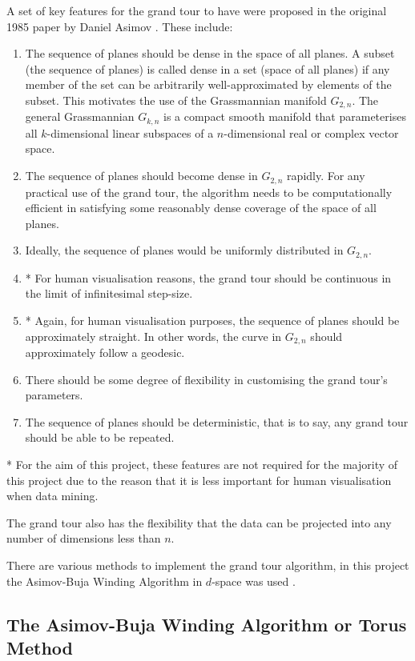 \documentclass[a4paper,11pt,twoside]{article}
\begin{document}
A set of key features for the grand tour to have were proposed in the original 1985 paper by Daniel Asimov \cite{Asimov1985}. These include:
\begin{enumerate}
\item The sequence of planes should be dense in the space of all planes. A subset (the sequence of planes) is called dense in a set (space of all planes) if any member of the set can be arbitrarily well-approximated by elements of the subset. This motivates the use of the Grassmannian manifold $G_{2,n}$. The general Grassmannian $G_{k,n}$ is a compact smooth manifold that parameterises all $k$-dimensional linear subspaces of a $n$-dimensional real or complex vector space.
\item The sequence of planes should become dense in $G_{2,n}$ rapidly. For any practical use of the grand tour, the algorithm needs to be computationally efficient in satisfying some reasonably dense coverage of the space of all planes.
\item Ideally, the sequence of planes would be uniformly distributed in $G_{2,n}$.
\item* For human visualisation reasons, the grand tour should be continuous in the limit of infinitesimal step-size.
\item* Again, for human visualisation purposes, the sequence of planes should be approximately straight. In other words, the curve in $G_{2,n}$ should approximately follow a geodesic.
\item There should be some degree of flexibility in customising the grand tour's parameters.
\item The sequence of planes should be deterministic, that is to say, any grand tour should be able to be repeated.
\end{enumerate}

* For the aim of this project, these features are not required for the majority of this project due to the reason that it is less important for human visualisation when data mining.
\newline

The grand tour also has the flexibility that the data can be projected into any number of dimensions less than $n$.
\newline

There are various methods to implement the grand tour algorithm, in this project the Asimov-Buja Winding Algorithm in $d$-space was used \cite{Asimov1985} \cite{Wegman2002}. 

\subsection{The Asimov-Buja Winding Algorithm or Torus Method}
\end{document}
